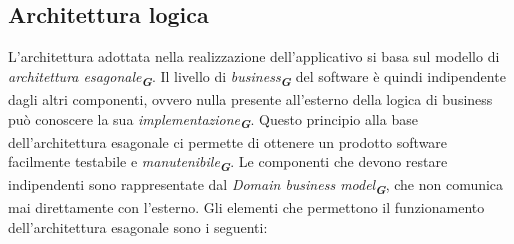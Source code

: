 \subsection{Architettura logica}
L’architettura adottata nella realizzazione dell’applicativo si basa sul modello di \emph{architettura esagonale}\textsubscript{\textbf{\textit{G}}}. Il livello di \emph{business}\textsubscript{\textbf{\textit{G}}} del software è quindi indipendente dagli altri componenti, ovvero nulla presente all’esterno della logica di business può conoscere la sua \emph{implementazione}\textsubscript{\textbf{\textit{G}}}. Questo principio alla base dell’architettura esagonale ci permette di ottenere un prodotto software facilmente testabile e \emph{manutenibile}\textsubscript{\textbf{\textit{G}}}. Le componenti che devono restare indipendenti sono rappresentate dal \emph{Domain business model}\textsubscript{\textbf{\textit{G}}}, che non comunica mai direttamente con l’esterno.
Gli elementi che permettono il funzionamento dell’architettura esagonale sono i seguenti:
